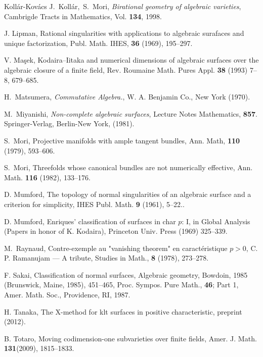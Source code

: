 \documentclass[12pt,twoside]{amsart}
\theoremstyle{definition}
\begin{document}
\begin{thebibliography}{Koll\'ar-Kov\'acs}
{J.~Koll\'ar,~S.~Mori},
{\em Birational geometry of algebraic varieties},
{Cambrigde Tracts in Mathematics, Vol. {\textbf{134}}, 1998}.


{J. Lipman},
{Rational singularities with applications to algebraic surafaces and 
unique factorization},
{Publ. Math. IHES, {\textbf{36}} (1969), 195--297.}


{V. Ma\c{s}ek},
Kodaira--Iitaka and numerical dimensions of algebraic surfaces 
over the algebraic closure of a finite field, 
{Rev. Roumaine Math. Pures Appl. {\textbf{38}} (1993) 7--8, 679--685}.


{H.~Matsumera},
{\em Commutative Algebra.},
{W. A. Benjamin Co., New York (1970)}.


{M.~Miyanishi},
{\em Non-complete algebraic surfaces},
{Lecture Notes Mathematics, {\textbf{857}}. Springer-Verlag, Berlin-New York, (1981)}.


{S.~Mori},
Projective manifolds with ample tangent bundles, 
{Ann. Math, {\textbf{110}} (1979), 593--606}.


{S.~Mori},
Threefolds whose canonical bundles are not numerically effective,
{Ann. Math. {\textbf{116}} (1982), 133--176}.


{D. Mumford},
The topology of normal singularities of an algebraic surface and a criterion for simplicity, 
{IHES Publ. Math. {\textbf{9}} (1961), 5–22.}.


{D. Mumford},
Enriques' classification of surfaces in char $p$: I, 
in Global Analysis (Papers in honor of K. Kodaira), 
{Princeton Univ. Press (1969) 325--339}.


{M.~Raynaud},
Contre-exemple au "vanishing theorem" 
en caract\'eristique $p>0$, 
{C. P. Ramanujam --- A tribute, 
Studies in Math., {\textbf{8}} (1978), 273--278}.






{F. Sakai},
Classification of normal surfaces, 
{Algebraic geometry, Bowdoin, 1985 (Brunswick, Maine, 1985), 
451--465, Proc. Sympos. Pure Math., {\textbf{46}}; Part 1, Amer. Math. Soc., Providence, RI, 1987}.


{H. Tanaka},
The X-method for klt surfaces in positive characteristic, 
{preprint (2012)}.


{B. Totaro},
Moving codimension-one subvarieties over finite fields, 
{Amer. J. Math. {\textbf{131}}(2009), 1815--1833}.



\end{thebibliography}
\end{document}
